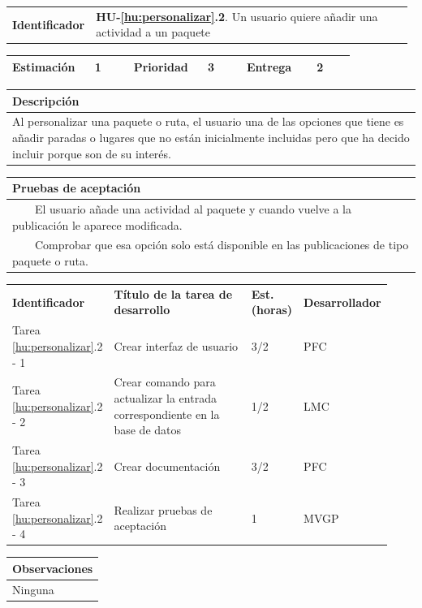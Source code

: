 \documentclass[11pt]{article}
\newcommand{\tabitem}{~~\llap{\textbullet}~~}
\begin{document}
\begin{longtable}{p{0.18\linewidth}|p{0.8\linewidth}}
  \rowcolor{LightCyan}
  \textbf{Identificador} & \textbf{{HU-\ref{hu:personalizar}.2}}. Un usuario quiere añadir una actividad a un paquete \\  
\end{longtable}
\vspace{-0.8cm}
\begin{longtable}{p{0.18\linewidth}|p{0.1\linewidth}|p{0.18\linewidth}|p{0.1\linewidth}|p{0.18\linewidth}|p{0.1\linewidth}}
  \toprule
  \textbf{Estimación} & 1 & \textbf{Prioridad} & 3 & \textbf{Entrega} & 2 \\
  \bottomrule
\end{longtable}
\vspace{-0.8cm}
\begin{longtable}{p{1.028\linewidth}}
  \textbf{Descripción}\\
  \midrule
  Al personalizar una paquete o ruta, el usuario una de las opciones que tiene es añadir paradas o lugares que no están inicialmente incluidas pero que ha decido incluir porque son de su interés. \\
  \bottomrule
\end{longtable}
\vspace{-0.8cm}
\begin{longtable}{p{1.028\linewidth}}
  \textbf{Pruebas de aceptación}\\
  \midrule
  \tabitem El usuario añade una actividad al paquete y cuando vuelve a la publicación le aparece modificada.\\
  \tabitem Comprobar que esa opción solo está disponible en las publicaciones de tipo paquete o ruta.\\
\end{longtable}
\vspace{-0.8cm}
\begin{longtable}{p{0.18\linewidth}|p{0.48\linewidth}|p{0.1\linewidth}|p{0.17\linewidth}}
  \toprule
  \textbf{Identificador} & \textbf{Título de la tarea de desarrollo} & \textbf{Est. (horas)} & \textbf{Desarrollador} \\
  Tarea \ref{hu:personalizar}.2 - 1 & Crear interfaz de usuario & 3/2 & PFC\\
  Tarea \ref{hu:personalizar}.2 - 2 & Crear comando para  actualizar la entrada correspondiente en la base de datos  & 1/2 & LMC\\
  Tarea \ref{hu:personalizar}.2 - 3 & Crear documentación & 3/2 & PFC\\
  Tarea \ref{hu:personalizar}.2 - 4 & Realizar pruebas de aceptación & 1 & MVGP \\
  \bottomrule
\end{longtable}
\vspace{-0.8cm}
\begin{longtable}{p{1.028\linewidth}}
  \textbf{Observaciones}\\
  \midrule
  Ninguna\\
  \bottomrule
\end{longtable}
\end{document}

